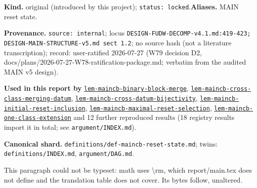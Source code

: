 \begin{defnote}
\textbf{Kind.} original (introduced by this project); \texttt{status: locked}.\quad\textbf{Aliases.} MAIN reset state.
\par
\textbf{Provenance.} \texttt{source: internal}; locus \texttt{DESIGN-\allowbreak{}FUDW-\allowbreak{}DECOMP-\allowbreak{}v4.\allowbreak{}1.\allowbreak{}md:\allowbreak{}419-\allowbreak{}423;\allowbreak{} DESIGN-\allowbreak{}MAIN-\allowbreak{}STRUCTURE-\allowbreak{}v5.\allowbreak{}md sect 1.\allowbreak{}2}; no source hash (not a literature transcription); record: user-\allowbreak{}ratified 2026-\allowbreak{}07-\allowbreak{}27 (W79 decision D2,\allowbreak{} docs/\allowbreak{}plans/\allowbreak{}2026-\allowbreak{}07-\allowbreak{}27-\allowbreak{}W78-\allowbreak{}ratification-\allowbreak{}package.\allowbreak{}md;\allowbreak{} verbatim from the audited MAIN v5 design).
\par
\textbf{Used in this report by} \hyperref[lem:maincb-binary-block-merge]{\texttt{lem-\allowbreak{}maincb-\allowbreak{}binary-\allowbreak{}block-\allowbreak{}merge}}, \hyperref[lem:maincb-cross-class-merging-datum]{\texttt{lem-\allowbreak{}maincb-\allowbreak{}cross-\allowbreak{}class-\allowbreak{}merging-\allowbreak{}datum}}, \hyperref[lem:maincb-cross-datum-bijectivity]{\texttt{lem-\allowbreak{}maincb-\allowbreak{}cross-\allowbreak{}datum-\allowbreak{}bijectivity}}, \hyperref[lem:maincb-initial-reset-inclusion]{\texttt{lem-\allowbreak{}maincb-\allowbreak{}initial-\allowbreak{}reset-\allowbreak{}inclusion}}, \hyperref[lem:maincb-maximal-reset-selection]{\texttt{lem-\allowbreak{}maincb-\allowbreak{}maximal-\allowbreak{}reset-\allowbreak{}selection}}, \hyperref[lem:maincb-one-class-extension]{\texttt{lem-\allowbreak{}maincb-\allowbreak{}one-\allowbreak{}class-\allowbreak{}extension}} and 12 further reproduced results (18 registry results import it in total; see \texttt{argument/INDEX.md}).
\par
\textbf{Canonical shard.} \texttt{definitions/\allowbreak{}def-\allowbreak{}maincb-\allowbreak{}reset-\allowbreak{}state.\allowbreak{}md}; twins: \texttt{definitions/INDEX.md}, \texttt{argument/DAG.md}.
\par
\begin{defflag}
This paragraph could not be typeset: math uses \textbackslash{}rm, which report/main.tex does not define and the translation table does not cover. Its bytes follow, unaltered.
\end{defflag}


\end{defnote}

